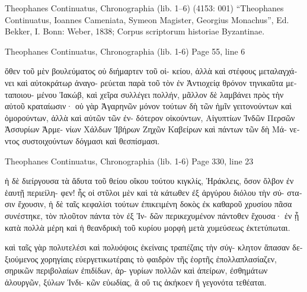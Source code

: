 \documentclass[12pt,letterpaper,twoside,final]{memoir}
\begin{document}
\begin{greek}
Theophanes Continuatus, Chronographia (lib. 1–6) (4153: 001)
“Theophanes Continuatus, Ioannes Cameniata, Symeon Magister, Georgius Monachus”, Ed. Bekker, I.
Bonn: Weber, 1838; Corpus scriptorum historiae Byzantinae.

Theophanes Continuatus, Chronographia (lib. 1-6) 
Page 55, line 6

                  ὅθεν τοῦ μὲν βουλεύματος οὐ διήμαρτεν τοῦ οἰ-  
κείου, ἀλλὰ καὶ στέφους μεταλαγχάνει καὶ αὐτοκράτωρ ἀναγο-
ρεύεται παρὰ τοῦ τὸν ἐν Ἀντιοχείᾳ θρόνον τηνικαῦτα μεταποιου-
μένου Ἰακώβ, καὶ χεῖρα συλλέγει πολλήν, μᾶλλον δὲ λαμβάνει 
πρὸς τὴν αὐτοῦ κραταίωσιν· οὐ γὰρ Ἀγαρηνῶν μόνον τούτων δὴ 
τῶν ἡμῖν γειτονούντων καὶ ὁμορούντων, ἀλλὰ καὶ αὐτῶν τῶν ἐν-
δότερον οἰκούντων, Αἰγυπτίων Ἰνδῶν Περσῶν Ἀσσυρίων Ἀρμε-
νίων Χάλδων Ἰβήρων Ζηχῶν Καβείρων καὶ πάντων τῶν δὴ Μά-
νεντος συστοιχούντων δόγμασι καὶ θεσπίσμασι. 



Theophanes Continuatus, Chronographia (lib. 1-6) 
Page 330, line 23

                        ἡ δὲ διείργουσα τὰ ἄδυτα τοῦ θείου 
οἴκου τούτου κιγκλίς, Ἡράκλεις, ὅσον ὄλβον ἐν ἑαυτῇ περιείλη-
φεν! ἧς οἱ στῦλοι μὲν καὶ τὰ κάτωθεν ἐξ ἀργύρου διόλου τὴν σύ-
στασιν ἔχουσιν, ἡ δὲ ταῖς κεφαλίσι τούτων ἐπικειμένη δοκὸς ἐκ 
καθαροῦ χρυσίου πᾶσα συνέστηκε, τὸν πλοῦτον πάντα τὸν ἐξ Ἰν-
δῶν περικεχυμένον πάντοθεν ἔχουσα· ἐν ᾗ κατὰ πολλὰ μέρη καὶ   
ἡ θεανδρικὴ τοῦ κυρίου μορφὴ μετὰ χυμεύσεως ἐκτετύπωται. 



                                                               καὶ 
ταῖς γὰρ πολυτελέσι καὶ πολυόψοις ἐκείναις τραπέζαις τὴν σύγ-
κλητον ἅπασαν δεξιούμενος χορηγίαις εὐεργετικωτέραις τὸ φαιδρὸν 
τῆς ἑορτῆς ἐπολλαπλασίαζεν, σηρικῶν περιβολαίων ἐπιδίδων, ἀρ-
γυρίων πολλῶν καὶ ἀπείρων, ἐσθημάτων ἁλουργῶν, ξύλων Ἰνδι-
κῶν εὐωδίας, ἃ οὔ τις ἀκήκοεν ἢ γεγονότα τεθέαται. 

\end{greek}
\end{document}
